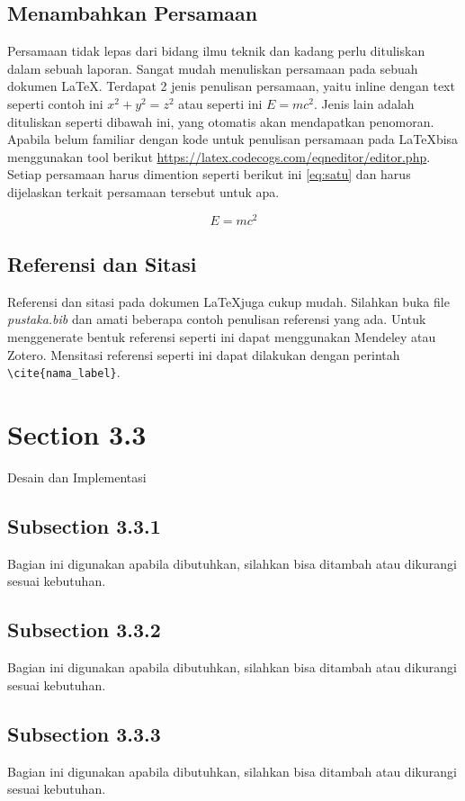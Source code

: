 \subsection{Menambahkan Persamaan}
Persamaan tidak lepas dari bidang ilmu teknik dan kadang perlu dituliskan dalam sebuah laporan. Sangat mudah menuliskan persamaan pada sebuah dokumen \LaTeX. Terdapat 2 jenis penulisan persamaan, yaitu inline dengan text seperti contoh ini \(x^2 + y^2 = z^2\) atau seperti ini $E=mc^2$. Jenis lain adalah dituliskan seperti dibawah ini, yang otomatis akan mendapatkan penomoran. Apabila belum familiar dengan kode untuk penulisan persamaan pada \LaTeX bisa menggunakan tool berikut \url{https://latex.codecogs.com/eqneditor/editor.php}. Setiap persamaan harus dimention seperti berikut ini \cref{eq:satu} dan harus dijelaskan terkait persamaan tersebut untuk apa.

\begin{equation}
    \label{eq:satu}
    E=mc^2
\end{equation}

\subsection{Referensi dan Sitasi}
Referensi dan sitasi pada dokumen \LaTeX juga cukup mudah. Silahkan buka file \textit{pustaka.bib} dan amati beberapa contoh penulisan referensi yang ada. Untuk menggenerate bentuk referensi seperti ini dapat menggunakan Mendeley atau Zotero. Mensitasi referensi seperti ini \cite{Kim2006} dapat dilakukan dengan perintah \verb|\cite{nama_label}|.

\section{Section 3.3}
Desain dan Implementasi

\subsection{Subsection 3.3.1}
Bagian ini digunakan apabila dibutuhkan, silahkan bisa ditambah atau dikurangi sesuai kebutuhan.

\subsection{Subsection 3.3.2}
Bagian ini digunakan apabila dibutuhkan, silahkan bisa ditambah atau dikurangi sesuai kebutuhan.

\subsection{Subsection 3.3.3}
Bagian ini digunakan apabila dibutuhkan, silahkan bisa ditambah atau dikurangi sesuai kebutuhan.

